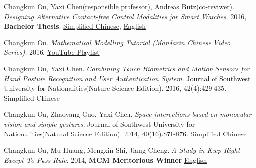    \item{
       Changkun Ou, Yaxi Chen(responsible professor), Andreas Butz(co-reviwer).
       \emph{Designing Alternative Contact-free Control Modalities for Smart Watches}. 
       2016, \textbf{Bachelor Thesis}. \href{https://changkun.us/files/cv/bachelor-thesis-cn.html}{Simplified Chinese}, 
       \href{https://changkun.us/files/cv/bachelor-thesis-en.html}{English}
   }
   \item{
       Changkun Ou.
       \emph{Mathematical Modelling Tutorial (Mandarin Chinese Video Series)}.
       2016, \href{https://www.youtube.com/watch?v=EUfXE3vP9_A&list=PLwUqqMt5en7c7iZIseCVAS5BX6RPkS-qR}{YouTube Playlist}
   }
   \item{
       Changkun Ou, Yaxi Chen. 
       \emph{Combining Touch Biometrics and Motion Sensors for Hand Posture Recognition and User Authentication System}. 
       Journal of Southwest University for Nationalities(Nature Science Edition). 
       2016, 42(4):429-435. \href{https://changkun.us/files/cv/touch.swun.html}{Simplified Chinese}
   }
   \item{
       Changkun Ou, Zhaoyang Guo, Yaxi Chen.
       \emph{Space interactions based on monocular vision and simple gestures}. 
       Journal of Southwest University for Nationalities(Natural Science Edition). 
       2014, 40(16):871-876. \href{https://changkun.us/files/cv/vision.swun.html}{Simplified Chinese}
   }
   \item{
       Changkun Ou, Mu Huang, Mengxin Shi, Jiang Cheng. 
       \emph{A Study in Keep-Right-Except-To-Pass Rule}. 
       2014, \textbf{MCM Meritorious Winner} \href{https://changkun.us/files/cv/28922.public.html}{English}
   }
 \resumeSubHeadingListEnd